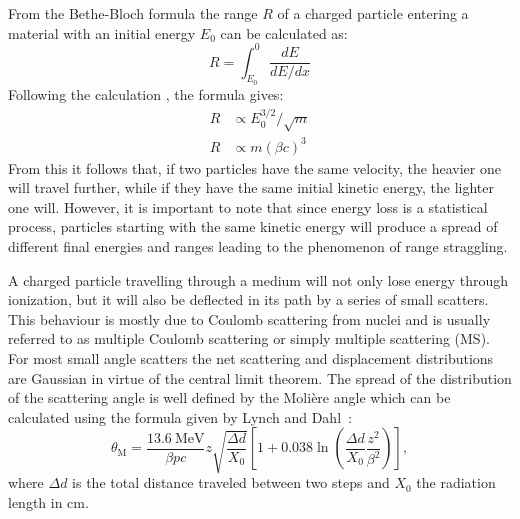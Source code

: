 From the Bethe-Bloch formula the range $R$ of a charged particle entering a material with an initial energy $E_0$ can be calculated as:
\begin{equation}
    R = \int_{E_0}^{0} \frac{dE}{dE/dx}
\end{equation}
Following the calculation \cite{Frass2009}, the formula gives:
\begin{align}
\label{eq:range}
    R & \propto E_0^{3/2}/\sqrt{m} \\
    R & \propto m(\beta c)^3
\end{align}
From this it follows that, if two particles have the same velocity, the heavier one will travel further, while if they have the same initial kinetic energy, the lighter one will. However, it is important to note that since energy loss is a statistical process, particles starting with the same kinetic energy will produce a spread of different final energies and ranges leading to the phenomenon of range straggling.

A charged particle travelling through a medium will not only lose energy through ionization, but it will also be deflected in its path by a series of small scatters. This behaviour is mostly due to Coulomb scattering from nuclei and is usually referred to as multiple Coulomb scattering or simply multiple scattering (MS). For most small angle scatters the net scattering and displacement distributions are Gaussian in virtue of the central limit theorem. The spread of the distribution of the scattering angle is well defined by the Molière angle which can be calculated using the formula given by Lynch and Dahl~\cite{LYNCH19916}:
\begin{equation}
\label{eq:MoliereAngle}
    \theta_{\textrm{M}} = \frac{13.6 \ \text{MeV}}{\beta pc}z\sqrt{\frac{\Delta d}{X_0}} \left[ 1+0.038\ln{\left(\frac{\Delta d}{X_0 }\frac{z^2}{\beta^2}\right)}\right], 
\end{equation}
where $\Delta d$ is the total distance traveled between two steps and $X_0$ the radiation length in cm.



